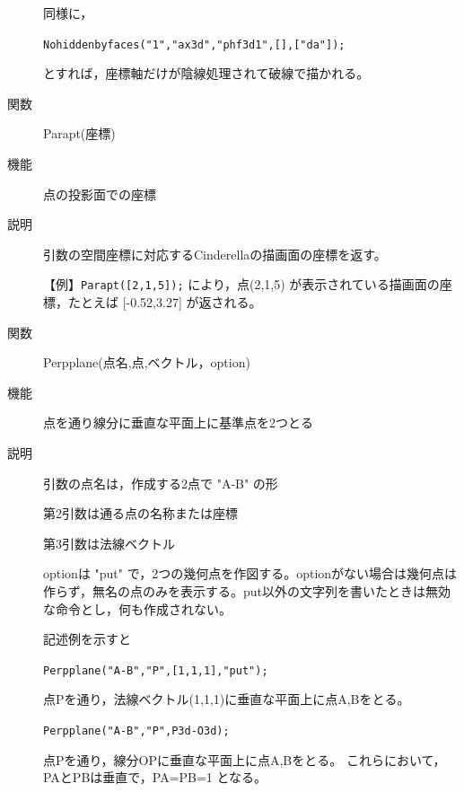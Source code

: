 \documentclass[papersize,a4paper,12pt,uplatex]{jsarticle}
\begin{document}
\begin{description}
\vspace{\baselineskip}
  \begin{center}      \end{center}
同様に，

  \verb|Nohiddenbyfaces("1","ax3d","phf3d1",[],["da"]);|
  
とすれば，座標軸だけが陰線処理されて破線で描かれる。

\vspace{\baselineskip}
\hypertarget{parapt}{}
\item[関数]  Parapt(座標)
\item[機能]  点の投影面での座標
\item[説明]  引数の空間座標に対応するCinderellaの描画面の座標を返す。

\vspace{\baselineskip}
【例】\verb|Parapt([2,1,5]);| により，点(2,1,5) が表示されている描画面の座標，たとえば [-0.52,3.27]  が返される。

\vspace{\baselineskip}
\hypertarget{perpplane}{}
\item[関数]  Perpplane(点名,点,ベクトル，option)
\item[機能]  点を通り線分に垂直な平面上に基準点を2つとる
\item[説明]  引数の点名は，作成する2点で "A-B" の形

第2引数は通る点の名称または座標
  
第3引数は法線ベクトル
  
optionは "put"  で，2つの幾何点を作図する。optionがない場合は幾何点は作らず，無名の点のみを表示する。put以外の文字列を書いたときは無効な命令とし，何も作成されない。
  
記述例を示すと
  
 \verb|Perpplane("A-B","P",[1,1,1],"put");|
    
点Pを通り，法線ベクトル(1,1,1)に垂直な平面上に点A,Bをとる。

 \verb|Perpplane("A-B","P",P3d-O3d);|
 
 点Pを通り，線分OPに垂直な平面上に点A,Bをとる。
 これらにおいて，PAとPBは垂直で，PA=PB=1 となる。
 

\end{description}
\end{document}
